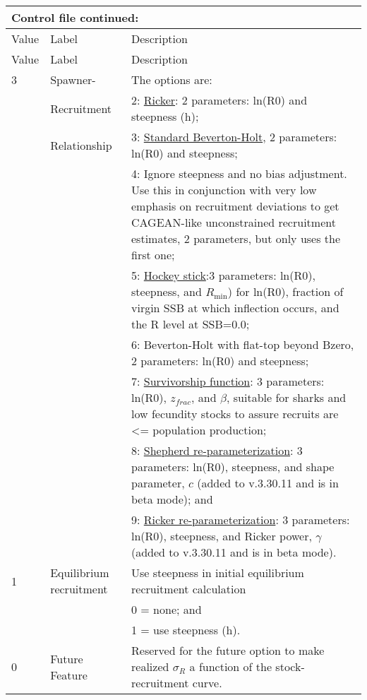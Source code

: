 \begin{longtable}{p{1cm} p{3cm} p{11cm}}
	\multicolumn{3}{l}{Control file continued:} \\
	\hline
	Value & Label & Description \Tstrut\Bstrut\\
	\hline
	\endfirsthead

	\hline
	Value & Label & Description \Tstrut\Bstrut\\
	\hline
	\endhead
	\hline
	\endfoot
	\endlastfoot

	3 & Spawner-            & The options are: \Tstrut\\
	  & Recruitment         & 2: \hyperlink{Ricker}{Ricker}: 2 parameters: ln(R0) and steepness (h); \\
	  & Relationship        & 3: \hyperlink{BH}{Standard Beverton-Holt}, 2 parameters: ln(R0) and steepness; \\
	  &                     & 4: Ignore steepness and no bias adjustment. Use this in conjunction with very low emphasis on recruitment deviations to get CAGEAN-like unconstrained recruitment estimates, 2 parameters, but only uses the first one; \\
	  &                     & 5: \hyperlink{Hockey}{Hockey stick}:3 parameters: ln(R0), steepness, and $R_{\text{min}}$) for ln(R0), fraction of virgin SSB at which inflection occurs, and the R level at SSB=0.0; \\
	  &                     & 6: Beverton-Holt with flat-top beyond Bzero, 2 parameters: ln(R0) and steepness; \\
	  &                     & 7: \hyperlink{Survivorship}{Survivorship function}: 3 parameters: ln(R0), $z_{frac}$, and $\beta$, suitable for sharks and low fecundity stocks to assure recruits are <= population production; \\
	  & 					& 8: \hyperlink{Shepherd}{Shepherd re-parameterization}: 3 parameters: ln(R0), steepness, and shape parameter, $c$ (added to v.3.30.11 and is in beta mode); and \\
	  & 					& 9: \hyperlink{Ricker2}{Ricker re-parameterization}: 3 parameters: ln(R0), steepness, and Ricker power, $\gamma$ (added to v.3.30.11 and is in beta mode). \Bstrut\\
	\hline

	1 \Tstrut & Equilibrium recruitment & Use steepness in initial equilibrium recruitment calculation \\
	  & 						& 0 = none; and \\
	  &							& 1 = use steepness (h). \\
	0 & Future Feature			& Reserved for the future option to make realized $\sigma_R$ a function of the stock-recruitment curve. \Bstrut\\ 
	\hline
\end{longtable}

